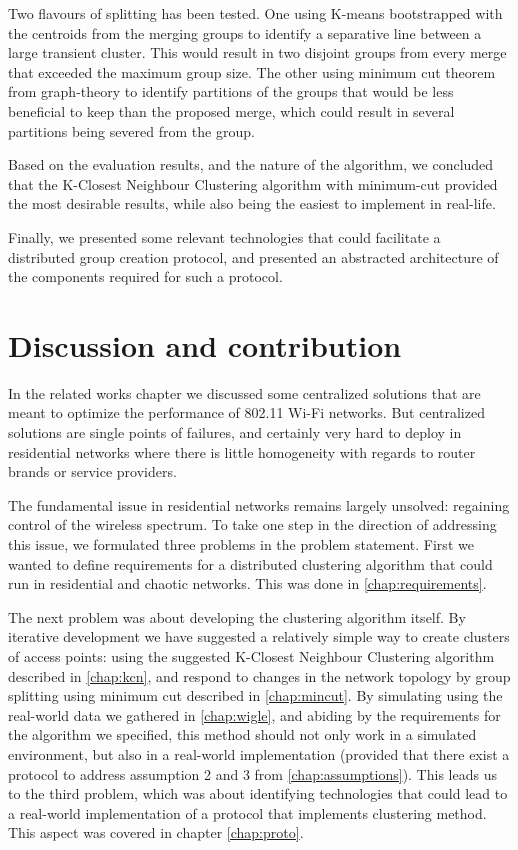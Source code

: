 Two flavours of splitting has been tested. One using K-means bootstrapped with the centroids from the merging groups to identify a separative line between a large transient cluster. This would result in
two disjoint groups from every merge that exceeded the maximum group size. The other using minimum cut theorem from graph-theory to identify partitions of the groups that would be less beneficial to keep than the proposed merge, which could result in several partitions being severed from the group. 

Based on the evaluation results, and the nature of the algorithm, we concluded that the K-Closest Neighbour Clustering algorithm with minimum-cut provided the most desirable results, while
also being the easiest to implement in real-life. 

Finally, we presented some relevant technologies that could facilitate a distributed group creation protocol, and presented an abstracted architecture of the components required for such a protocol.

\section{Discussion and contribution}
In the related works chapter we discussed some centralized solutions that are meant 
to optimize the performance of 802.11 Wi-Fi networks. But centralized solutions are single points of failures, and certainly very hard to deploy in residential networks where there
is little homogeneity with regards to router brands or service providers. 

The fundamental issue in residential networks remains largely unsolved: regaining control of the wireless spectrum. To take one step in the direction of addressing this issue,
we formulated three problems in the problem statement. First we wanted to define requirements for a distributed clustering algorithm that could run in residential and chaotic networks.
This was done in \ref{chap:requirements}.

The next problem was about developing the clustering algorithm itself. By iterative development we have suggested a relatively simple way to create clusters of access points: using the suggested K-Closest Neighbour Clustering algorithm described in \ref{chap:kcn}, and respond to changes in the network topology by group splitting using minimum cut described in \ref{chap:mincut}. By simulating using the real-world data we gathered in \ref{chap:wigle}, and abiding by the requirements for the algorithm we specified, this method should not only work in a simulated environment, but also in a real-world implementation (provided that there exist a protocol to address assumption 2 and 3 from \ref{chap:assumptions}). This leads us to the third problem, which was about identifying
technologies that could lead to a real-world implementation of a protocol that implements clustering method. This aspect was covered in chapter \ref{chap:proto}.

